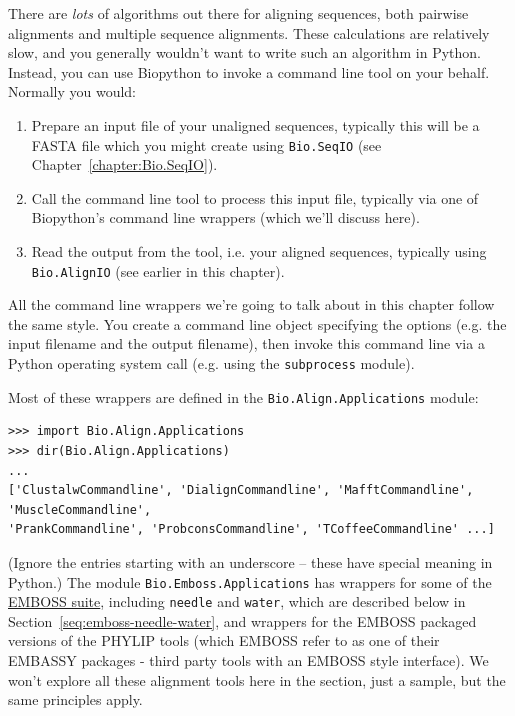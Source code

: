 \documentclass{report}
\begin{document}
There are \emph{lots} of algorithms out there for aligning sequences, both pairwise alignments
and multiple sequence alignments. These calculations are relatively slow, and you generally
wouldn't want to write such an algorithm in Python. Instead, you can use Biopython to invoke
a command line tool on your behalf. Normally you would:
\begin{enumerate}
\item Prepare an input file of your unaligned sequences, typically this will be a FASTA file
      which you might create using \verb|Bio.SeqIO| (see Chapter~\ref{chapter:Bio.SeqIO}).
\item Call the command line tool to process this input file, typically via one of Biopython's
      command line wrappers (which we'll discuss here).
\item Read the output from the tool, i.e. your aligned sequences, typically using
      \verb|Bio.AlignIO| (see earlier in this chapter). 
\end{enumerate}

All the command line wrappers we're going to talk about in this chapter follow the same style.
You create a command line object specifying the options (e.g. the input filename and the
output filename), then invoke this command line via a Python operating system call (e.g.
using the \texttt{subprocess} module).

Most of these wrappers are defined in the \verb|Bio.Align.Applications| module:

\begin{verbatim}
>>> import Bio.Align.Applications
>>> dir(Bio.Align.Applications)
...
['ClustalwCommandline', 'DialignCommandline', 'MafftCommandline', 'MuscleCommandline',
'PrankCommandline', 'ProbconsCommandline', 'TCoffeeCommandline' ...]
\end{verbatim}

\noindent (Ignore the entries starting with an underscore -- these have
special meaning in Python.)
The module \verb|Bio.Emboss.Applications| has wrappers for some of the
\href{http://emboss.sourceforge.net/}{EMBOSS suite}, including
\texttt{needle} and \texttt{water}, which are described below in
Section~\ref{seq:emboss-needle-water}, and wrappers for the EMBOSS
packaged versions of the PHYLIP tools (which EMBOSS refer to as one
of their EMBASSY packages - third party tools with an EMBOSS style
interface).
We won't explore all these alignment tools here in the section, just a
sample, but the same principles apply.
\end{document}
